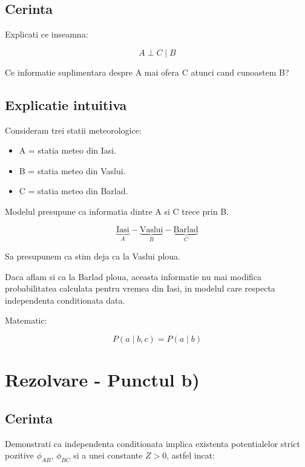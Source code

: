 \documentclass[12pt,a4paper]{article}
\begin{document}
\subsection*{Cerinta}

Explicati ce inseamna:

\[
A\perp C\mid B
\]

Ce informatie suplimentara despre A mai ofera C atunci cand cunoastem B?

\subsection*{Explicatie intuitiva}

Consideram trei statii meteorologice:

\begin{itemize}
    \item A = statia meteo din Iasi.
    \item B = statia meteo din Vaslui.
    \item C = statia meteo din Barlad.
\end{itemize}

Modelul presupune ca informatia dintre A si C trece prin B.

\[
\underbrace{\text{Iasi}}_A
-
\underbrace{\text{Vaslui}}_B
-
\underbrace{\text{Barlad}}_C
\]

Sa presupunem ca stim deja ca la Vaslui ploua.

Daca aflam si ca la Barlad ploua, aceasta informatie nu mai modifica probabilitatea calculata pentru vremea din Iasi, in modelul care respecta independenta conditionata data.

Matematic:

\[
\boxed{
P(a\mid b,c)=P(a\mid b)
}
\]

\section{Rezolvare - Punctul b)}

\subsection*{Cerinta}

Demonstrati ca independenta conditionata implica existenta potentialelor strict pozitive $\phi_{AB}$, $\phi_{BC}$ si a unei constante $Z>0$, astfel incat:
\end{document}
